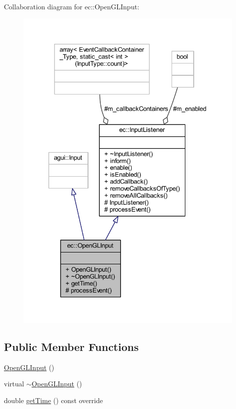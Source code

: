 Collaboration diagram for ec\+:\+:Open\+G\+L\+Input\+:\nopagebreak
\begin{figure}[H]
\begin{center}
\leavevmode
\includegraphics[width=330pt]{classec_1_1_open_g_l_input__coll__graph}
\end{center}
\end{figure}
\subsection*{Public Member Functions}
\begin{DoxyCompactItemize}
\item 
\mbox{\hyperlink{classec_1_1_open_g_l_input_a7046406475d576873c287a64ea4d3cb6}{Open\+G\+L\+Input}} ()
\item 
virtual \mbox{\hyperlink{classec_1_1_open_g_l_input_ab4a3fa6d2e349d8dbf4de8b50a7a81ae}{$\sim$\+Open\+G\+L\+Input}} ()
\item 
double \mbox{\hyperlink{classec_1_1_open_g_l_input_a5a4c1780a904c55d5ac38272234b87a7}{get\+Time}} () const override
\end{DoxyCompactItemize}
